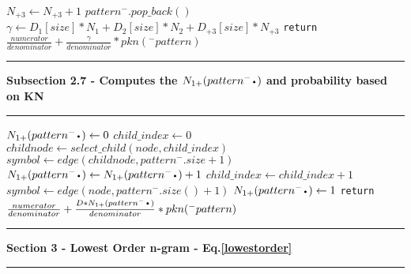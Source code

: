 \documentclass[11pt]{article}
\newcommand\Algphase[1]{%
\vspace*{-.7\baselineskip}\Statex\hspace*{\dimexpr-\algorithmicindent-2pt\relax}\rule{\textwidth}{0.1pt}%
\Statex\hspace*{-\algorithmicindent}\textbf{#1}%
\vspace*{-.7\baselineskip}\Statex\hspace*{\dimexpr-\algorithmicindent-2pt\relax}\rule{\textwidth}{0.1pt}%
}
\newcommand*{\LargerCdot}{\raisebox{-0.75ex}{\scalebox{2}{$\cdot$}}}
\begin{document}
\begin{algorithm*}
\begin{algorithmic}
                        \State $N_{+3}\gets N_{+3} + 1$
                    \EndIf
                    \State $pattern^{-}.pop\_back()$
                \EndIf
            \EndIf
        \EndIf
        \State $\gamma\gets D_1[size]*N_1 + D_2[size]*N_2 + D_{+3}[size]*N_{+3}$
        \vspace{2mm}
		\State \texttt{return } $\frac{numerator}{denominator}+\frac{\gamma}{denominator}*pkn(^{-}pattern)$
		\vspace{2mm}
    \Algphase{ Subsection 2.7 - Computes the $N_{1+}(pattern^{-}\LargerCdot)$ and probability based on KN}
	\Else
	    \State $N_{1+}(pattern^{-}\LargerCdot)\gets 0$
		    \State $child\_index\gets 0$
			    \State $childnode\gets select\_child(node,child\_index)$
			    \State $symbol\gets edge(childnode,pattern^{-}.size+1)$
			        \State $N_{1+}(pattern^{-}\LargerCdot)\gets N_{1+}(pattern^{-}\LargerCdot)+1$
    			\EndIf	
	    	    \State $child\_index\gets child\_index+1$				
		    \EndWhile
	    \Else
		    \State $symbol\gets edge(node,pattern^{-}.size()+1)$
	   		    \State $N_{1+}(pattern^{-}\LargerCdot)\gets 1$
		    \EndIf	
	    \EndIf
	    \State \texttt{return } $\frac{numerator}{denominator}+\frac{D* N_{1+}(pattern^{-}\LargerCdot)}{denominator}*pkn(^{-}pattern)$
	\EndIf

\Algphase{Section 3 - Lowest Order n-gram - Eq.\ref{lowestorder}}


\end{algorithmic}
\end{algorithm*}
\end{document}

